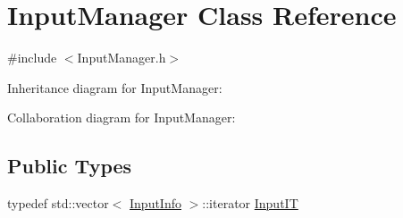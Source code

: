 \hypertarget{classInputManager}{}\section{Input\+Manager Class Reference}
\label{classInputManager}


{\ttfamily \#include $<$Input\+Manager.\+h$>$}



Inheritance diagram for Input\+Manager\+:


Collaboration diagram for Input\+Manager\+:
\subsection*{Public Types}
\begin{DoxyCompactItemize}
\item 
typedef std\+::vector$<$ \hyperlink{structInputInfo}{Input\+Info} $>$\+::iterator \hyperlink{classInputManager_a97ddfabc7a35e32edf633e568a728879}{Input\+IT}
\end{DoxyCompactItemize}
